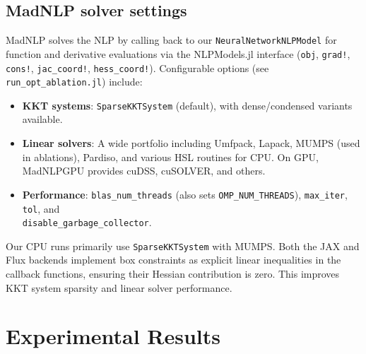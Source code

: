 \documentclass[11pt]{article}
\begin{document}
\subsection{MadNLP solver settings}
MadNLP solves the NLP by calling back to our \texttt{NeuralNetworkNLPModel} for function and derivative evaluations via the NLPModels.jl interface (\texttt{obj}, \texttt{grad!}, \texttt{cons!}, \texttt{jac\_coord!}, \texttt{hess\_coord!}). Configurable options (see \texttt{run\_opt\_ablation.jl}) include:
\begin{itemize}[leftmargin=1.5em]
  \item \textbf{KKT systems}: \texttt{SparseKKTSystem} (default), with dense/condensed variants available.
  \item \textbf{Linear solvers}: A wide portfolio including Umfpack, Lapack, MUMPS (used in ablations), Pardiso, and various HSL routines for CPU. On GPU, MadNLPGPU provides cuDSS, cuSOLVER, and others.
  \item \textbf{Performance}: \texttt{blas\_num\_threads} (also sets \texttt{OMP\_NUM\_THREADS}), \texttt{max\_iter}, \texttt{tol}, and \\\texttt{disable\_garbage\_collector}.
\end{itemize}
Our CPU runs primarily use \texttt{SparseKKTSystem} with MUMPS. Both the JAX and Flux backends implement box constraints as explicit linear inequalities in the callback functions, ensuring their Hessian contribution is zero. This improves KKT system sparsity and linear solver performance.

\section{Experimental Results}
\end{document}
